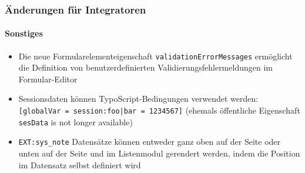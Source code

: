 \begin{frame}[fragile]
	\frametitle{Änderungen für Integratoren}
	\framesubtitle{Sonstiges}

	\begin{itemize}
		\item Die neue Formularelementeigenschaft \texttt{validationErrorMessages} ermöglicht die
			Definition von benutzerdefinierten Validierungsfehlermeldungen im Formular-Editor

		\item Sessionsdaten können TypoScript-Bedingungen verwendet werden:\newline
			\small
				\texttt{[globalVar = session:foo|bar = 1234567]}
			\normalsize
			\newline
			\small
				(ehemals öffentliche Eigenschaft \texttt{sesData} is not longer available)
			\normalsize

		\item \texttt{EXT:sys\_note} Datensätze können entweder ganz oben auf der Seite oder unten auf der Seite und
			im Listenmodul gerendert werden, indem die Position im Datensatz selbst definiert wird

	\end{itemize}

\end{frame}

